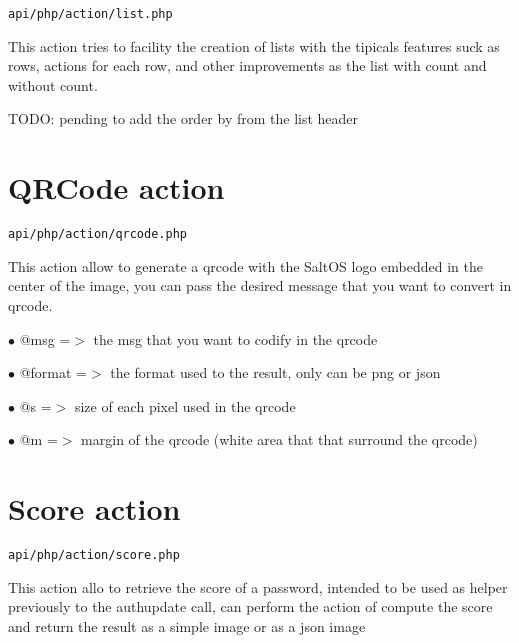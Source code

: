 \documentclass[a4paper]{book}
\begin{document}
\begin{lstlisting}
api/php/action/list.php
\end{lstlisting}

This action tries to facility the creation of lists with the tipicals
features suck as rows, actions for each row, and other improvements as
the list with count and without count.

TODO: pending to add the order by from the list header

\hypertarget{toc16}{}
\section{QRCode action}

\begin{lstlisting}
api/php/action/qrcode.php
\end{lstlisting}

This action allow to generate a qrcode with the SaltOS logo embedded
in the center of the image, you can pass the desired message that you
want to convert in qrcode.

\begin{compactitem}
\item[\color{myblue}$\bullet$] @msg    =$>$ the msg that you want to codify in the qrcode
\item[\color{myblue}$\bullet$] @format =$>$ the format used to the result, only can be png or json
\end{compactitem}

\begin{compactitem}
\item[\color{myblue}$\bullet$] @s =$>$ size of each pixel used in the qrcode
\item[\color{myblue}$\bullet$] @m =$>$ margin of the qrcode (white area that that surround the qrcode)
\end{compactitem}

\hypertarget{toc17}{}
\section{Score action}

\begin{lstlisting}
api/php/action/score.php
\end{lstlisting}

This action allo to retrieve the score of a password, intended to be used
as helper previously to the authupdate call, can perform the action of
compute the score and return the result as a simple image or as a json
image
\end{document}
